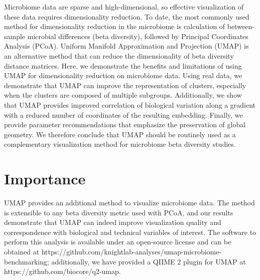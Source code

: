 \glsresetall



Microbiome data are sparse and high-dimensional, so effective visualization of these data requires dimensionality reduction. To date, the most commonly used method for dimensionality reduction in the microbiome is calculation of between-sample microbial differences (beta diversity), followed by Principal Coordinates Analysis (PCoA). Uniform Manifold Approximation and Projection (UMAP) is an alternative method that can reduce the dimensionality of beta diversity distance matrices. Here, we demonstrate the benefits and limitations of using UMAP for dimensionality reduction on microbiome data. Using real data, we demonstrate that UMAP can improve the representation of clusters, especially when the clusters are composed of multiple subgroups. Additionally, we show that UMAP provides improved correlation of biological variation along a gradient with a reduced number of coordinates of the resulting embedding. Finally, we provide parameter recommendations that emphasize the preservation of global geometry. We therefore conclude that UMAP should be routinely used as a complementary visualization method for microbiome beta diversity studies.


\section{Importance}
UMAP provides an additional method to visualize microbiome data. The method is extensible to any beta diversity metric used with PCoA, and our results demonstrate that UMAP can indeed improve visualization quality and correspondence with biological and technical variables of interest. The software to perform this analysis is available under an open-source license and can be obtained at https://github.com/knightlab-analyses/umap-microbiome-benchmarking; additionally, we have provided a QIIME 2 plugin for UMAP at\\ https://github.com/biocore/q2-umap.

